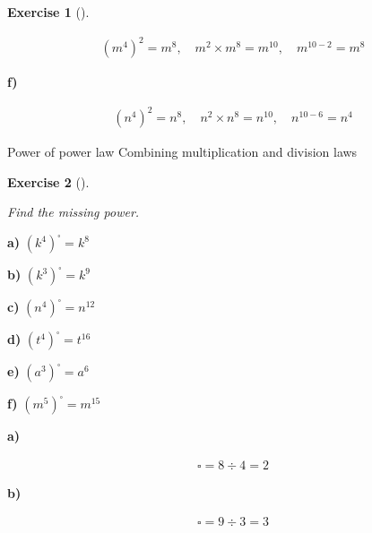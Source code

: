 \documentclass[
  letterpaper,
  DIV=11,
  numbers=noendperiod]{scrreprt}
\theoremstyle{definition}
\newtheorem{exercise}{Exercise}[chapter]
\theoremstyle{remark}
\begin{document}
\begin{exercise}[]
\begin{tcolorbox}
\[
\begin{aligned}
(m^{4})^{2}=m^{8},\quad m^{2}\times m^{8}=m^{10},\quad m^{10-2}=m^{8}
\end{aligned}
\]

\textbf{f)}

\[
\begin{aligned}
(n^{4})^{2}=n^{8},\quad n^{2}\times n^{8}=n^{10},\quad n^{10-6}=n^{4}
\end{aligned}
\]

\end{tcolorbox}

{Power of power law} {Combining multiplication and division laws}

\end{exercise}

\begin{exercise}[]\protect\hypertarget{exr-u2-29}{}\label{exr-u2-29}

\emph{Find the missing power.}

\textbf{a)} \(\displaystyle (k^{4})^{\square} = k^{8}\)

\textbf{b)} \(\displaystyle (k^{3})^{\square} = k^{9}\)

\textbf{c)} \(\displaystyle (n^{4})^{\square} = n^{12}\)

\textbf{d)} \(\displaystyle (t^{4})^{\square} = t^{16}\)

\textbf{e)} \(\displaystyle (a^{3})^{\square} = a^{6}\)

\textbf{f)} \(\displaystyle (m^{5})^{\square} = m^{15}\)

\begin{tcolorbox}[enhanced jigsaw, opacitybacktitle=0.6, coltitle=black, arc=.35mm, colframe=quarto-callout-tip-color-frame, colback=white, bottomrule=.15mm, left=2mm, colbacktitle=quarto-callout-tip-color!10!white, titlerule=0mm, opacityback=0, title=\textcolor{quarto-callout-tip-color}{\faLightbulb}\hspace{0.5em}{🔍 View Solutions}, leftrule=.75mm, breakable, rightrule=.15mm, bottomtitle=1mm, toptitle=1mm, toprule=.15mm]

\textbf{a)}

\[
\begin{aligned}
\square = 8 \div 4 = 2
\end{aligned}
\]

\textbf{b)}

\[
\begin{aligned}
\square = 9 \div 3 = 3
\end{aligned}
\]


\end{tcolorbox}
\end{exercise}
\end{document}
